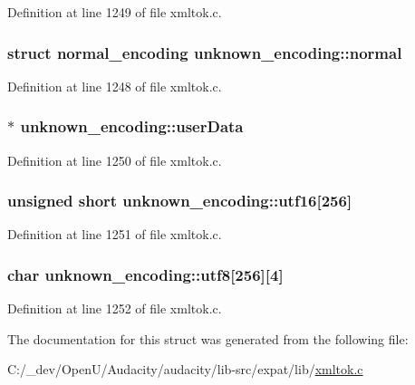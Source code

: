 Definition at line 1249 of file xmltok.\+c.

\subsubsection[{\texorpdfstring{normal}{normal}}]{\setlength{\rightskip}{0pt plus 5cm}struct {\bf normal\+\_\+encoding} unknown\+\_\+encoding\+::normal}\hypertarget{structunknown__encoding_ae43fb7292b46e2baaac780e67e42fdc3}{}\label{structunknown__encoding_ae43fb7292b46e2baaac780e67e42fdc3}


Definition at line 1248 of file xmltok.\+c.

\subsubsection[{\texorpdfstring{user\+Data}{userData}}]{$\ast$ unknown\+\_\+encoding\+::user\+Data}\hypertarget{structunknown__encoding_addea046f1af692252868f899c0160fa7}{}\label{structunknown__encoding_addea046f1af692252868f899c0160fa7}


Definition at line 1250 of file xmltok.\+c.

\subsubsection[{\texorpdfstring{utf16}{utf16}}]{\setlength{\rightskip}{0pt plus 5cm}unsigned short unknown\+\_\+encoding\+::utf16\mbox{[}256\mbox{]}}\hypertarget{structunknown__encoding_a6ed1343e8621126068ba7913d187172f}{}\label{structunknown__encoding_a6ed1343e8621126068ba7913d187172f}


Definition at line 1251 of file xmltok.\+c.

\subsubsection[{\texorpdfstring{utf8}{utf8}}]{\setlength{\rightskip}{0pt plus 5cm}char unknown\+\_\+encoding\+::utf8\mbox{[}256\mbox{]}\mbox{[}4\mbox{]}}\hypertarget{structunknown__encoding_ae42e3f5d5f65098ea9039b2a35789184}{}\label{structunknown__encoding_ae42e3f5d5f65098ea9039b2a35789184}


Definition at line 1252 of file xmltok.\+c.



The documentation for this struct was generated from the following file\+:\begin{DoxyCompactItemize}
\item 
C\+:/\+\_\+dev/\+Open\+U/\+Audacity/audacity/lib-\/src/expat/lib/\hyperlink{xmltok_8c}{xmltok.\+c}\end{DoxyCompactItemize}

